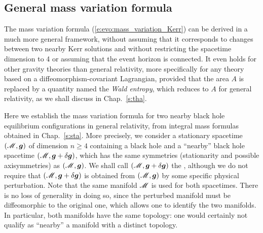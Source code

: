 \subsection{General mass variation formula} \label{s:evo:gen_mass_variation}

The mass variation formula (\ref{e:evo:mass_variation_Kerr}) can be derived in
a much more general framework, without assuming that it corresponds to changes between
two nearby Kerr solutions and without restricting
the spacetime dimension to 4 or assuming that the event horizon is connected.
It even holds for other gravity theories than general relativity, more specifically
for any theory based on a diffeomorphism-covariant Lagrangian, provided that
the area $A$ is replaced by a quantity named the \emph{Wald entropy}, which reduces to $A$ for general relativity, as we shall discuss in Chap.~\ref{s:tha}.

Here we establish the mass variation formula for two nearby black hole
equilibrium configurations in general relativity,
from integral mass formulas obtained in Chap.~\ref{s:sta}.
More precisely, we consider a stationary spacetime $(\mathscr{M},\bm{g})$ of dimension $n\geq 4$
containing
a black hole and a ``nearby'' black hole spacetime $(\mathscr{M},\bm{g}+\delta\bm{g})$, which has the
same symmetries (stationarity and possible axisymmetries) as $(\mathscr{M},\bm{g})$.
We shall call $(\mathscr{M},\bm{g}+\delta\bm{g})$ the ,
although we do not require that $(\mathscr{M},\bm{g}+\delta\bm{g})$ is obtained from
$(\mathscr{M},\bm{g})$ by some specific physical perturbation.
Note that the same manifold $\mathscr{M}$ is used for both spacetimes.
There is no loss of generality in doing so, since the perturbed manifold
must be diffeomorphic to the original one, which allows one to
identify the two manifolds. In particular, both manifolds have the same
topology: one would certainly not qualify as ``nearby'' a manifold with a distinct topology.



